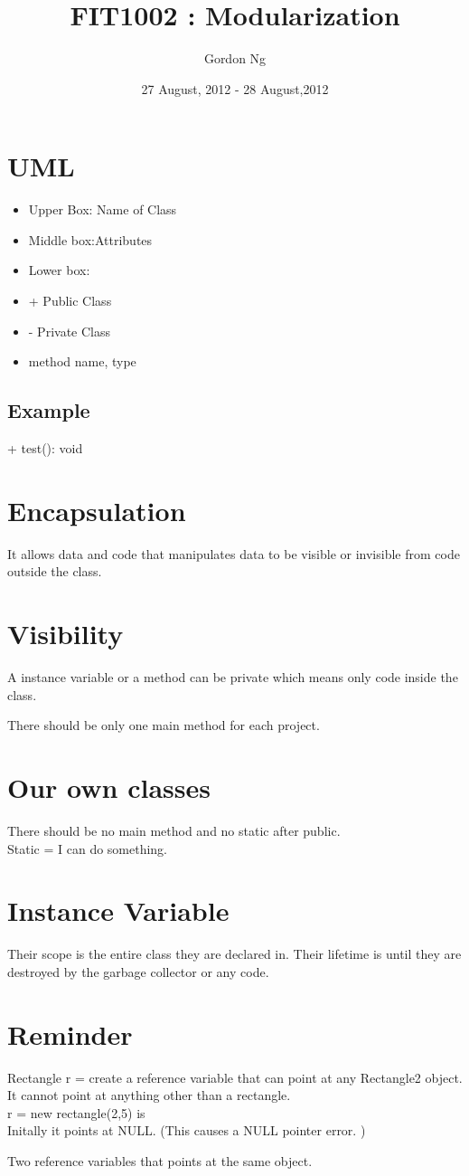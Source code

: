 \documentclass[12pt]{article}
\begin{document}
\title{FIT1002 : Modularization}
\date{27 August, 2012 - 28 August,2012 }
\author{Gordon Ng}
\maketitle

\pagebreak
\tableofcontents
\pagebreak

\section{UML}
\begin{itemize}
\item Upper Box: Name of Class
\item Middle box:Attributes
\item Lower box:
\item + Public Class
\item - Private Class
\item method name, type
\end{itemize}
\subsection{Example}
+ test(): void

\section{Encapsulation}
It allows data and code that manipulates data to be visible or invisible from code outside the class.

\section{Visibility}
A instance variable or a method can be private which means only code inside the class. 

There should be only one main method for each project.

\section{Our own classes}
There should be no main method and no static after public. \\
Static = I can do something.
\section{Instance Variable}
Their scope is the entire class they are declared in. Their lifetime is until they are destroyed by the garbage collector or any code.


\section{Reminder}
Rectangle r = create a reference variable that can point at any Rectangle2 object. It cannot point at anything other than a rectangle. \\
r = new rectangle(2,5) is \\ 
Initally it points at NULL. (This causes a NULL pointer error.  )

Two reference variables that points at the same object.
\end{document}
